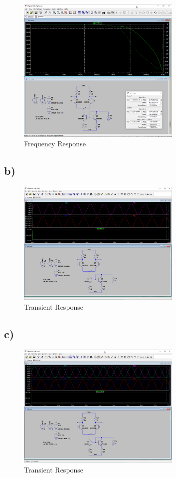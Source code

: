 \documentclass{article}
\begin{document}
	\begin{figure}[H]
	    \centering
	    \includegraphics[width=0.7\textwidth]{1a-2}
	    \caption{Frequency Response}
	\end{figure}
	
	\subsection*{b)}
	
	\begin{figure}[H]
	    \centering
	    \includegraphics[width=0.7\textwidth]{1b-1}
	    \caption{Transient Response}
	\end{figure}
	
	\subsection*{c)}

	\begin{figure}[H]
	    \centering
	    \includegraphics[width=0.7\textwidth]{1c-1}
	    \caption{Transient Response}
	\end{figure}
	
\end{document}
